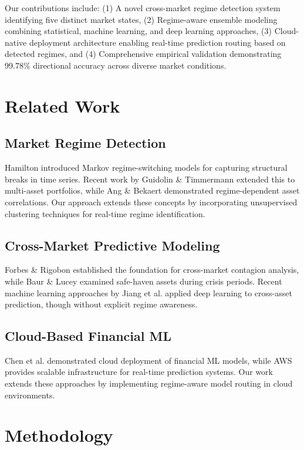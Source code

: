 \documentclass[conference]{IEEEtran}
\begin{document}
Our contributions include: (1) A novel cross-market regime detection system identifying five distinct market states, (2) Regime-aware ensemble modeling combining statistical, machine learning, and deep learning approaches, (3) Cloud-native deployment architecture enabling real-time prediction routing based on detected regimes, and (4) Comprehensive empirical validation demonstrating 99.78\% directional accuracy across diverse market conditions.

\section{Related Work}

\subsection{Market Regime Detection}
Hamilton \cite{hamilton1989} introduced Markov regime-switching models for capturing structural breaks in time series. Recent work by Guidolin \& Timmermann \cite{guidolin2008} extended this to multi-asset portfolios, while Ang \& Bekaert \cite{ang2002} demonstrated regime-dependent asset correlations. Our approach extends these concepts by incorporating unsupervised clustering techniques for real-time regime identification.

\subsection{Cross-Market Predictive Modeling}
Forbes \& Rigobon \cite{forbes2002} established the foundation for cross-market contagion analysis, while Baur \& Lucey \cite{baur2010} examined safe-haven assets during crisis periods. Recent machine learning approaches by Jiang et al. \cite{jiang2017} applied deep learning to cross-asset prediction, though without explicit regime awareness.

\subsection{Cloud-Based Financial ML}
Chen et al. \cite{chen2021} demonstrated cloud deployment of financial ML models, while AWS \cite{aws2023} provides scalable infrastructure for real-time prediction systems. Our work extends these approaches by implementing regime-aware model routing in cloud environments.

\section{Methodology}
\end{document}
